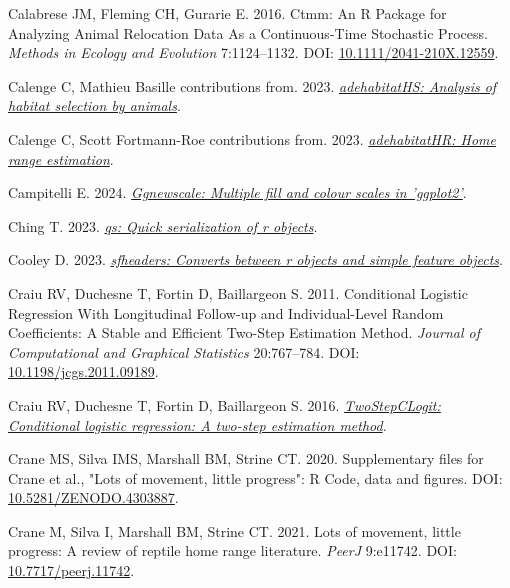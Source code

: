 \documentclass[10pt,a4paper]{article}
\newlength{\cslhangindent}
\newenvironment{CSLReferences}[2] %
 {\begin{list}{}{%
  \setlength{\itemindent}{0pt}
  \setlength{\leftmargin}{0pt}
  \setlength{\parsep}{0pt}
  \ifodd #1
   \setlength{\leftmargin}{\cslhangindent}
   \setlength{\itemindent}{-1\cslhangindent}
  \fi
  \setlength{\itemsep}{#2\baselineskip}}}
 {\end{list}}
\begin{document}
\begin{CSLReferences}{1}{0}
Calabrese JM, Fleming CH, Gurarie E. 2016. Ctmm: An {R} {Package} for {Analyzing} {Animal} {Relocation} {Data} {As} a {Continuous}-{Time} {Stochastic} {Process}. \emph{Methods in Ecology and Evolution} 7:1124--1132. DOI: \href{https://doi.org/10.1111/2041-210X.12559}{10.1111/2041-210X.12559}.

Calenge C, Mathieu Basille contributions from. 2023. \emph{\href{https://CRAN.R-project.org/package=adehabitatHS}{{adehabitatHS}: Analysis of habitat selection by animals}}.

Calenge C, Scott Fortmann-Roe contributions from. 2023. \emph{\href{https://CRAN.R-project.org/package=adehabitatHR}{{adehabitatHR}: Home range estimation}}.

Campitelli E. 2024. \emph{\href{https://CRAN.R-project.org/package=ggnewscale}{Ggnewscale: Multiple fill and colour scales in 'ggplot2'}}.

Ching T. 2023. \emph{\href{https://CRAN.R-project.org/package=qs}{{qs}: Quick serialization of r objects}}.

Cooley D. 2023. \emph{\href{https://CRAN.R-project.org/package=sfheaders}{{sfheaders}: Converts between r objects and simple feature objects}}.

Craiu RV, Duchesne T, Fortin D, Baillargeon S. 2011. Conditional {Logistic} {Regression} {With} {Longitudinal} {Follow}-up and {Individual}-{Level} {Random} {Coefficients}: {A} {Stable} and {Efficient} {Two}-{Step} {Estimation} {Method}. \emph{Journal of Computational and Graphical Statistics} 20:767--784. DOI: \href{https://doi.org/10.1198/jcgs.2011.09189}{10.1198/jcgs.2011.09189}.

Craiu RV, Duchesne T, Fortin D, Baillargeon S. 2016. \emph{\href{https://CRAN.R-project.org/package=TwoStepCLogit}{TwoStepCLogit: Conditional logistic regression: A two-step estimation method}}.

Crane MS, Silva IMS, Marshall BM, Strine CT. 2020. Supplementary files for {Crane} et al., "{Lots} of movement, little progress": {R} {Code}, data and figures. DOI: \href{https://doi.org/10.5281/ZENODO.4303887}{10.5281/ZENODO.4303887}.

Crane M, Silva I, Marshall BM, Strine CT. 2021. Lots of movement, little progress: A review of reptile home range literature. \emph{PeerJ} 9:e11742. DOI: \href{https://doi.org/10.7717/peerj.11742}{10.7717/peerj.11742}.


\end{CSLReferences}
\end{document}
